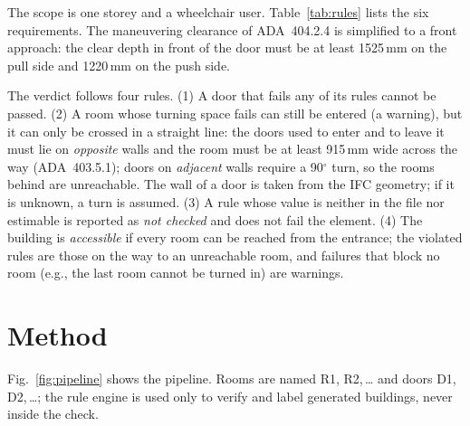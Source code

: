 \documentclass[conference]{IEEEtran}
\newcommand{\ada}[1]{ADA~#1}
\begin{document}
The scope is one storey and a wheelchair user. Table~\ref{tab:rules} lists the six requirements. The maneuvering
clearance of \ada{404.2.4} is simplified to a front approach: the clear depth in front of the door must be at least
1525\,mm on the pull side and 1220\,mm on the push side.

\begin{table}[t]
\caption{ADA requirements checked and the agent responsible}
\label{tab:rules}
\centering
{}
\end{table}

The verdict follows four rules. (1) A door that fails any of its rules cannot be passed. (2) A room whose turning
space fails can still be entered (a warning), but it can only be crossed in a straight line: the doors used to enter
and to leave it must lie on \emph{opposite} walls and the room must be at least 915\,mm wide across the way
(\ada{403.5.1}); doors on \emph{adjacent} walls require a 90$^\circ$ turn, so the rooms behind are unreachable. The
wall of a door is taken from the IFC geometry; if it is unknown, a turn is assumed. (3) A rule whose value is
neither in the file nor estimable is reported as \emph{not checked} and does not fail the element. (4) The building
is \emph{accessible} if every room can be reached from the entrance; the violated rules are those on the way to an
unreachable room, and failures that block no room (e.g., the last room cannot be turned in) are warnings.

\section{Method}

Fig.~\ref{fig:pipeline} shows the pipeline. Rooms are named R1, R2,\,\dots{} and doors D1, D2,\,\dots{}; the
rule engine is used only to verify and label generated buildings, never inside the check.
\end{document}
